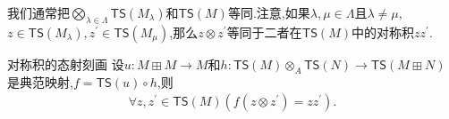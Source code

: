 \begin{remark}{}{}
	我们通常把$\bigotimes\limits_{\lambda\in\Lambda}\mathsf{TS}\left(M_{\lambda}\right)$和$\mathsf{TS}\left(M\right)$等同.注意,如果$\lambda,\mu\in\Lambda$且$\lambda\neq\mu$,$z\in\mathsf{TS}\left(M_{\lambda}\right),z^{\prime}\in\mathsf{TS}\left(M_{\mu}\right)$,那么$z\otimes z^{\prime}$等同于二者在$\mathsf{TS}\left(M\right)$中的对称积$zz^{\prime}$.
\end{remark}

\begin{proposition}{对称积的态射刻画}{}
	设$u:M\boxplus M\to M$和$h:\mathsf{TS}\left(M\right)\otimes_{A}\mathsf{TS}\left(N\right)\to\mathsf{TS}\left(M\boxplus N\right)$是典范映射,$f=\mathsf{TS}\left(u\right)\circ h$,则
	\begin{align*}
		\forall z,z^{\prime}\in\mathsf{TS}\left(M\right)\left(f\left(z\otimes z^{\prime}\right)=zz^{\prime}\right).
	\end{align*}
\end{proposition}













































